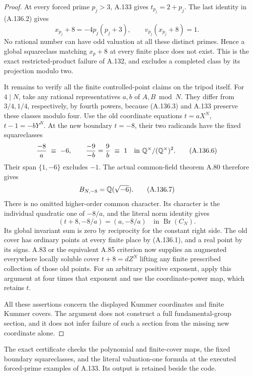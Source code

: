 \begin{proof}
At every forced prime \(p_j>3\), A.133 gives
\(t_{p_j}=2+p_j\).
The last identity in (A.136.2) gives
\[
             x_{p_j}+8=-4p_j(p_j+3),\qquad
             v_{p_j}(x_{p_j}+8)=1 .
\tag{A.136.5}
\]
No rational number can have odd valuation at all
these distinct primes.  Hence a global squareclass
matching \(x_p+8\) at every finite place does not
exist.  This is the exact restricted-product
failure of A.132, and excludes a completed class
by its projection modulo two.

It remains to verify all the finite controlled-point
claims on the tripod itself.
For \(4\mid N\), take any rational representatives
\(a,b\) of \(A,B\bmod N\).
They differ from \(3/4,1/4\), respectively, by
fourth powers, because (A.136.3) and A.133 preserve
these classes modulo four.
Use the old coordinate equations \(t=aX^N\),
\(t-1=-bY^N\).
At the new boundary \(t=-8\), their two radicands
have the fixed squareclasses
\[
       \frac{-8}{a}\ \equiv\ -6,\qquad
       \frac{-9}{-b}=\frac9b\ \equiv\ 1
                    \quad\text{in }\mathbb Q^\times/(\mathbb Q^\times)^2.
\tag{A.136.6}
\]
Their span \(\{1,-6\}\) excludes \(-1\).
The actual common-field theorem A.80 therefore gives
\[
                B_{N,-8}=\mathbb Q(\sqrt{-6}).
\tag{A.136.7}
\]
There is no omitted higher-order common character.
Its character is the individual quadratic one
of \(-8/a\), and the literal norm identity gives
\[
        (t+8,-8/a)=(a,-8/a)
                           \quad\text{in }\operatorname{Br}(C_N).
\tag{A.136.8}
\]
Its global invariant sum is zero by reciprocity
for the constant right side.
The old cover has ordinary points at every finite
place by (A.136.1), and a real point by its signs.
A.83 or the equivalent A.85 criterion now supplies
an augmented everywhere locally soluble cover
\(t+8=dZ^N\) lifting any finite prescribed collection
of those old points.
For an arbitrary positive exponent, apply this
argument at four times that exponent and use
the coordinate-power map, which retains \(t\).

All these assertions concern the displayed Kummer
coordinates and finite Kummer covers.
The argument does not construct a full fundamental-group
section, and it does not infer failure of such a section
from the missing new coordinate alone.
\end{proof}

The exact certificate
checks the polynomial and finite-cover maps, the
fixed boundary squareclasses, and the literal
valuation-one formula at the executed forced-prime
examples of A.133.  Its output is retained beside
the code.

